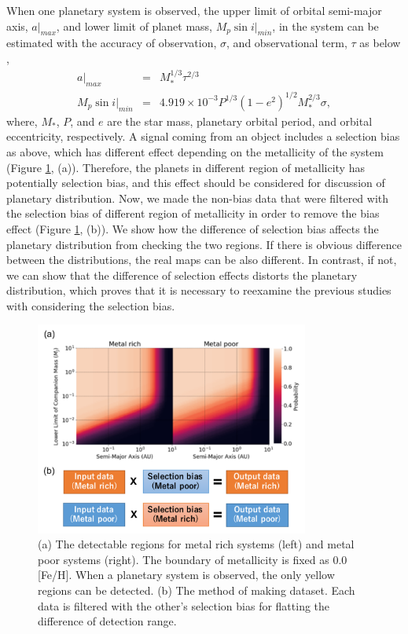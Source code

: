 \documentclass[twocolumn, dvipdfmx]{aastex62}
\begin{document}
\begin{CJK*}{UTF8}{min}
When one planetary system is observed, the upper limit of orbital semi-major axis, $a|_{max}$, and lower limit of planet mass, $M_p\sin i|_{min}$, in the system can be estimated with the accuracy of observation, $\sigma$, and observational term, $\tau$ as below \citep{2008ApJ...677.1324T},
\begin{eqnarray}
a|_{max} &=& M_{*}^{1/3}\tau^{2/3} \\
M_p\sin i|_{min} &=& 4.919\times10^{-3}P^{1/3}(1-e^2)^{1/2}M_{*}^{2/3}\sigma ,
\end{eqnarray}
where, $M_*$, $P$, and $e$ are the star mass, planetary orbital period, and orbital eccentricity, respectively. A signal coming from an object includes a selection bias as above, which has different effect depending on the metallicity of the system (Figure \ref{fig:bias}, (a)). Therefore, the planets in different region of metallicity has potentially selection bias, and this effect should be considered for discussion of planetary distribution. Now, we made the non-bias data that were filtered with the selection bias of different region of metallicity in order to remove the bias effect (Figure \ref{fig:bias}, (b)). We show how the difference of selection bias affects the planetary distribution from checking the two regions. If there is obvious difference between the distributions, the real maps can be also different. In contrast, if not, we can show that the difference of selection effects distorts the planetary distribution, which proves that it is necessary to reexamine the previous studies with considering the selection bias.


\begin{figure}[H]
\begin{center}
\includegraphics[width=9cm]{../../../Figure/selection_bias.pdf}
\caption{(a) The detectable regions for metal rich systems (left) and metal poor systems (right). The boundary of metallicity is fixed as 0.0 [Fe/H]. When a planetary system is observed, the only yellow regions can be detected. (b) The method of making dataset. Each data is filtered with the other's selection bias for flatting the difference of detection range. \label{fig:bias}}
\end{center}
\end{figure}



\end{CJK*}
\end{document}
